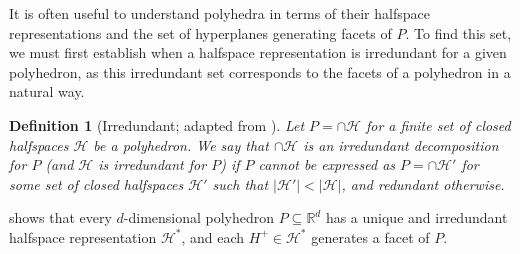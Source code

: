 \documentclass[11pt]{article}
\newcommand{\Comments}{1}
\newcommand{\mytodo}[2]{\ifnum\Comments=1%
  \todo[linecolor=#1!80!black,backgroundcolor=#1,bordercolor=#1!80!black]{#2}\fi}
\newcommand{\raft}[1]{\mytodo{green!20!white}{RF: #1}}
\newcommand{\reals}{\mathbb{R}}
\renewcommand{\H}{\mathcal{H}}
\newtheorem{claim}{Claim}
\newtheorem{definition}{Definition}
\begin{document}

It is often useful to understand polyhedra in terms of their halfspace representations and the set of hyperplanes generating facets of $P$.
To find this set, we must first establish when a halfspace representation is irredundant for a given polyhedron, as this irredundant set corresponds to the facets of a polyhedron in a natural way.

\begin{definition}[Irredundant; adapted from {\citet{gallier2008notes}}]\label{def:irredundant}
	Let $P = \cap \H$ for a finite set of closed halfspaces $\H$ be a polyhedron.
	We say that $\cap \H$ is an \emph{irredundant decomposition} for $P$ (and $\H$ is irredundant for $P$) if $P$ cannot be expressed as $P = \cap \H'$ for some set of closed halfspaces $\H'$ such that $|\H'| < |\H|$, and redundant otherwise.
\end{definition}

\citet{gallier2008notes} shows that every $d$-dimensional polyhedron $P \subseteq \reals^d$ has a unique and irredundant halfspace representation $\H^*$, and each $H^+ \in \H^*$ generates a facet of $P$.
\end{document}
